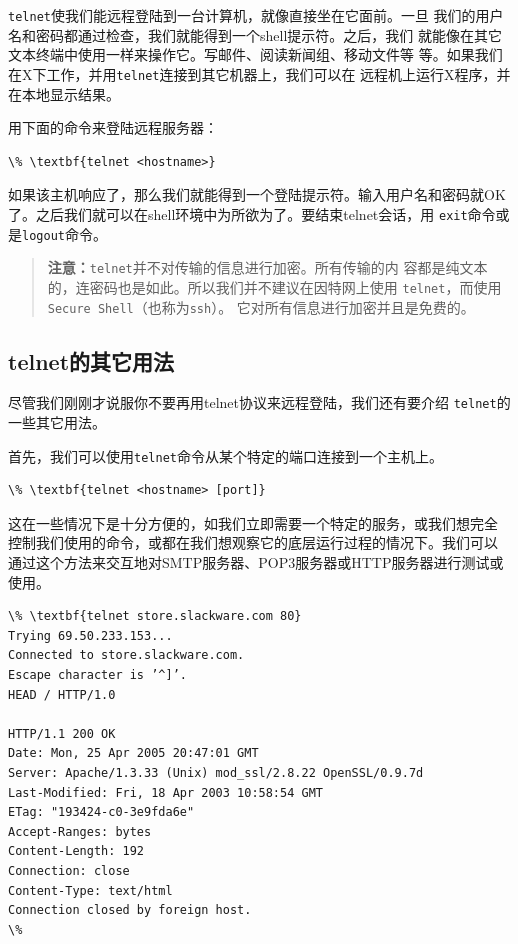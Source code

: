 \texttt{telnet}使我们能远程登陆到一台计算机，就像直接坐在它面前。一旦
我们的用户名和密码都通过检查，我们就能得到一个shell提示符。之后，我们
就能像在其它文本终端中使用一样来操作它。写邮件、阅读新闻组、移动文件等
等。如果我们在X下工作，并用\texttt{telnet}连接到其它机器上，我们可以在
远程机上运行X程序，并在本地显示结果。

用下面的命令来登陆远程服务器：
\begin{Verbatim}[frame=single, commandchars=\\\{\}]
\% \textbf{telnet <hostname>}
\end{Verbatim}
如果该主机响应了，那么我们就能得到一个登陆提示符。输入用户名和密码就OK
了。之后我们就可以在shell环境中为所欲为了。要结束telnet会话，用
\texttt{exit}命令或是\texttt{logout}命令。
\begin{quote}
  \textbf{注意：}\texttt{telnet}并不对传输的信息进行加密。所有传输的内
  容都是纯文本的，连密码也是如此。所以我们并不建议在因特网上使用
  \texttt{telnet}，而使用\texttt{Secure Shell}（也称为\texttt{ssh}）。
  它对所有信息进行加密并且是免费的。
\end{quote}

\subsection{telnet的其它用法}
\label{chap:basicNetworkCommands:telnet:otherUse}
尽管我们刚刚才说服你不要再用telnet协议来远程登陆，我们还有要介绍
\texttt{telnet}的一些其它用法。

首先，我们可以使用\texttt{telnet}命令从某个特定的端口连接到一个主机上。
\begin{Verbatim}[frame=single, commandchars=\\\{\}]
\% \textbf{telnet <hostname> [port]}
\end{Verbatim}

这在一些情况下是十分方便的，如我们立即需要一个特定的服务，或我们想完全
控制我们使用的命令，或都在我们想观察它的底层运行过程的情况下。我们可以
通过这个方法来交互地对SMTP服务器、POP3服务器或HTTP服务器进行测试或使用。
\begin{Verbatim}[frame=single, commandchars=\\\{\}]
\% \textbf{telnet store.slackware.com 80}
Trying 69.50.233.153...
Connected to store.slackware.com.
Escape character is ’^]’.
HEAD / HTTP/1.0

HTTP/1.1 200 OK
Date: Mon, 25 Apr 2005 20:47:01 GMT
Server: Apache/1.3.33 (Unix) mod_ssl/2.8.22 OpenSSL/0.9.7d
Last-Modified: Fri, 18 Apr 2003 10:58:54 GMT
ETag: "193424-c0-3e9fda6e"
Accept-Ranges: bytes
Content-Length: 192
Connection: close
Content-Type: text/html
Connection closed by foreign host.
\%
\end{Verbatim}

